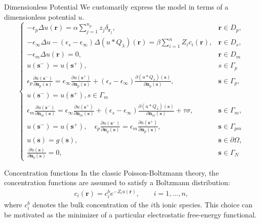 \documentclass{beamer}
\newcommand{\rr}{{\mathbf r}}
\newcommand{\s}{{\mathbf s}}
\newcommand{\nn}{{\mathbf n}}
\begin{document}
\begin{frame}{Dimensionless Potential}
    We customarily express the model in terms of a dimensionless potential $u.$ 
    \begin{equation}
\label{nonlocal-Poisson-u}
 \left\{\begin{array}{cl}
     -\epsilon_p\Delta u(\rr) =\alpha \sum\limits_{j=1}^{n_{p}}z_{j}  \delta_{\rr_{j}}, & \rr \in D_p,\\
-\epsilon_{\infty}\Delta u - (\epsilon_s-\epsilon_{\infty}) \Delta(u\ast  Q_{\lambda})(\rr)
= \beta \sum\limits_{i=1}^{n}Z_{i}c_i(\rr), & \rr \in D_s,\\
-\epsilon_m \Delta u(\rr) = 0, & \rr \in D_m \\
u(\s^{-}) = u(\s^{+}), & s \in \Gamma_p\\
\epsilon_p\frac{\partial u(\s^{-})}{\partial \nn_p(\s)} = \epsilon_\infty\frac{\partial u(\s^{+})}{\partial \nn_p(\s)}+(\epsilon_s-\epsilon_\infty)\frac{\partial (u\ast Q_{\lambda})(\s)}{\partial \nn_p(\s)}, & \s\in\Gamma_p,\\
u(\s^{-}) = u(\s^{+}), s \in \Gamma_m\\
\epsilon_m\frac{\partial u(\s^{-})}{\partial \nn_m(\s)} = \epsilon_\infty\frac{\partial u(\s^{+})}{\partial \nn_m(\s)}+(\epsilon_s-\epsilon_\infty)\frac{\partial (u\ast Q_{\lambda})(\s)}{\partial \nn_m(\s)} + \tau \sigma, & \s\in\Gamma_m,\\
u(\s^{-}) = u(\s^{+}), \quad  \epsilon_p\frac{\partial u(\s^{-})}{\partial \nn_p(\s)} = \epsilon_m\frac{\partial u(\s^{+})}{\partial \nn_p(\s)}, \quad &\s \in \Gamma_{pm} \\
   u(\s) = g(\s), & \s \in \partial \Omega, \\
   \frac{\partial u (\s)}{\partial \nn_b(\s)} = 0, & \s \in \Gamma_N
\end{array}
\right.
\end{equation}  
\end{frame}
\begin{frame}{Concentration functions}
    In the classic Poisson-Boltzmann theory, the concentration functions are assumed to satisfy a Boltzmann distribution:
    \begin{align}
    c_i(\rr) = c_i^b e^{-Z_i u(\rr)}, \qquad i = 1,\ldots , n,
\end{align}
where $c_i^b$ denotes the bulk concentration of the $i$th ionic species. This choice can be motivated as the minimizer of a particular electrostatic free-energy functional. 
\end{frame}
\end{document}
